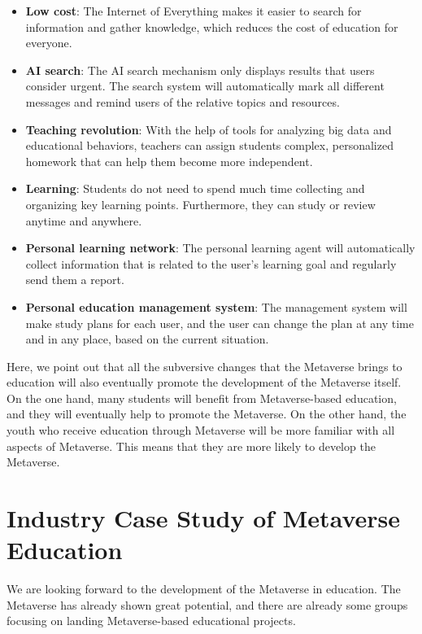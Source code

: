 \documentclass[conference]{IEEEtran}
\begin{document}
\begin{itemize}
    \item \textbf{Low cost}: The Internet of Everything makes it easier to search for information and gather knowledge, which reduces the cost of education for everyone.
    
    \item \textbf{AI search}: The AI search mechanism only displays results that users consider urgent. The search system will automatically mark all different messages and remind users of the relative topics and resources.
    
    \item \textbf{Teaching revolution}: With the help of tools for analyzing big data and educational behaviors, teachers can assign students complex, personalized homework that can help them become more independent.
    
    \item \textbf{Learning}: Students do not need to spend much time collecting and organizing key learning points. Furthermore, they can study or review anytime and anywhere.
    
    \item \textbf{Personal learning network}: The personal learning agent will automatically collect information that is related to the user's learning goal and regularly send them a report.
    
    \item \textbf{Personal education management system}: The management system will make study plans for each user, and the user can change the plan at any time and in any place, based on the current situation.
\end{itemize}

Here, we point out that all the subversive changes that the Metaverse brings to education will also eventually promote the development of the Metaverse itself. On the one hand, many students will benefit from Metaverse-based education, and they will eventually help to promote the Metaverse. On the other hand, the youth who receive education through Metaverse will be more familiar with all aspects of Metaverse. This means that they are more likely to develop the Metaverse.


\section{Industry Case Study of Metaverse Education}
\label{sec:cases}

We are looking forward to the development of the Metaverse in education. The Metaverse has already shown great potential, and there are already some groups focusing on landing Metaverse-based educational projects.
\end{document}
